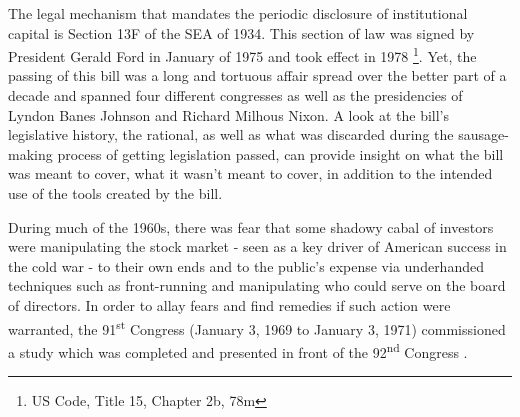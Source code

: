 The legal mechanism that mandates the periodic disclosure of institutional capital is Section 13F of the SEA of 1934.  This section of law was signed by President Gerald Ford in January of 1975 and took effect in 1978 \footnote{US Code, Title 15, Chapter 2b, 78m}\nocite{US Code}. Yet, the passing of this bill was a long and tortuous affair spread over the better part of a decade and spanned four different congresses as well as the presidencies of Lyndon Banes Johnson and Richard Milhous Nixon. A look at the bill's legislative history, the rational, as well as what was discarded during the sausage-making process of getting legislation passed, can provide insight on what the bill was meant to cover, what it wasn't meant to cover, in addition to the intended use of the tools created by the bill.  
	
During much of the 1960s, there was fear that some shadowy cabal of investors were manipulating the stock market - seen as a key driver of American success in the cold war - to their own ends and to the public's expense via underhanded techniques such as front-running and manipulating who could serve on the board of directors.  In order to allay fears and find remedies if such action were warranted, the 91\textsuperscript{st} Congress (January 3, 1969 to January 3, 1971) commissioned a study which was completed and presented in front of the 92\textsuperscript{nd} Congress \citep{Hearing71}.
	
